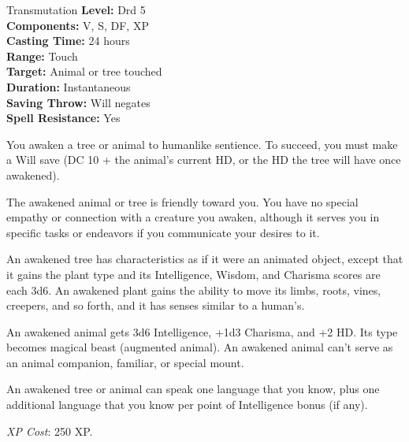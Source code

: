 {Transmutation}
{
	\textbf{Level:}
	Drd 5\\
	\textbf{Components:}
	V, S, DF, XP\\
	\textbf{Casting Time:}
	24 hours\\
	\textbf{Range:}
	Touch\\
	\textbf{Target:}
	Animal or tree touched\\
	\textbf{Duration:}
	Instantaneous\\
	\textbf{Saving Throw:}
	Will negates\\
	\textbf{Spell Resistance:}
	Yes\\
}
{
	You awaken a tree or animal to humanlike sentience. To succeed, you must make a Will save (DC 10 + the animal's current HD, or the HD the tree will have once awakened).

	The awakened animal or tree is friendly toward you. You have no special empathy or connection with a creature you awaken, although it serves you in specific tasks or endeavors if you communicate your desires to it.

	An awakened tree has characteristics as if it were an animated object, except that it gains the plant type and its Intelligence, Wisdom, and Charisma scores are each 3d6. An awakened plant gains the ability to move its limbs, roots, vines, creepers, and so forth, and it has senses similar to a human's.

	An awakened animal gets 3d6 Intelligence, +1d3 Charisma, and +2 HD. Its type becomes magical beast (augmented animal). An awakened animal can't serve as an animal companion, familiar, or special mount.

	An awakened tree or animal can speak one language that you know, plus one additional language that you know per point of Intelligence bonus (if any).

	\textit{XP Cost}:
	250 XP.

}
